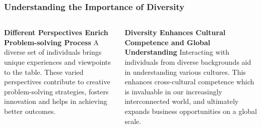 \documentclass[5pt]{beamer}
\begin{document}
\begin{frame}
\frametitle{Understanding the Importance of Diversity}
\begin{columns}
\begin{column}{0.45\textwidth}
\begin{block}{\textbf{Different Perspectives Enrich Problem-solving Process}}
A diverse set of individuals brings unique experiences and viewpoints to the table. These varied perspectives contribute to creative problem-solving strategies, fosters innovation and helps in achieving better outcomes.
\end{block}
\end{column}
\begin{column}{0.45\textwidth}
\begin{block}{\textbf{Diversity Enhances Cultural Competence and Global Understanding}}
Interacting with individuals from diverse backgrounds aid in understanding various cultures. This enhances cross-cultural competence which is invaluable in our increasingly interconnected world, and ultimately expands business opportunities on a global scale.
\end{block}
\end{column}
\end{columns}
\end{frame}
\end{document}
